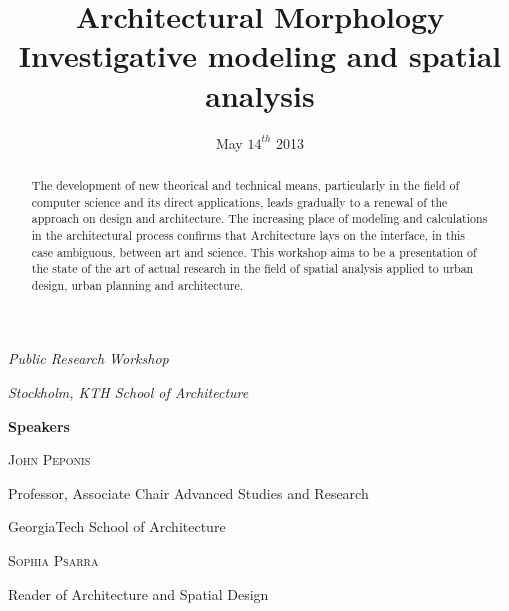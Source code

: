 \documentclass[english]{article}
\date{May $14^{th}$ 2013}
\newcommand{\noun}[1]{\textsc{#1}}
\begin{document}
\title{Architectural Morphology\\
Investigative modeling and spatial analysis}

\maketitle
\bigskip{}
\bigskip{}
\bigskip{}


\textit{\large \hfill{}Public Research Workshop\hfill{}\hfill{}}{\large \par}

\textit{\large \hfill{}Stockholm, KTH School of Architecture\hfill{}\hfill{}}{\large \par}

\bigskip{}
\bigskip{}
\bigskip{}
\bigskip{}

\begin{abstract}
The development of new theorical and technical means, particularly
in the field of computer science and its direct applications, leads
gradually to a renewal of the approach on design and architecture.
The increasing place of modeling and calculations in the architectural
process confirms that Architecture lays on the interface, in this
case ambiguous, between art and science. This workshop aims to be
a presentation of the state of the art of actual research in the field
of spatial analysis applied to urban design, urban planning and architecture.
\end{abstract}
\newpage{}

\textit{\large \hfill{}}\textbf{\Large Speakers}\textit{\large \hfill{}\hfill{}}{\large \par}

\bigskip{}
\bigskip{}


\textit{\large \hfill{}}\noun{John Peponis}\textit{\large \hfill{}\hfill{}}{\large \par}

\textit{\large \hfill{}}Professor, Associate Chair Advanced Studies
and Research\textit{\large \hfill{}\hfill{}}{\large \par}

\textit{\large \hfill{}}GeorgiaTech School of Architecture\textit{\large \hfill{}\hfill{}}{\large \par}

\bigskip{}


\textit{\large \hfill{}}\noun{Sophia Psarra}\textit{\large \hfill{}\hfill{}}{\large \par}

\textit{\large \hfill{}}Reader of Architecture and Spatial Design\textit{\large \hfill{}\hfill{}}{\large \par}
\end{document}
